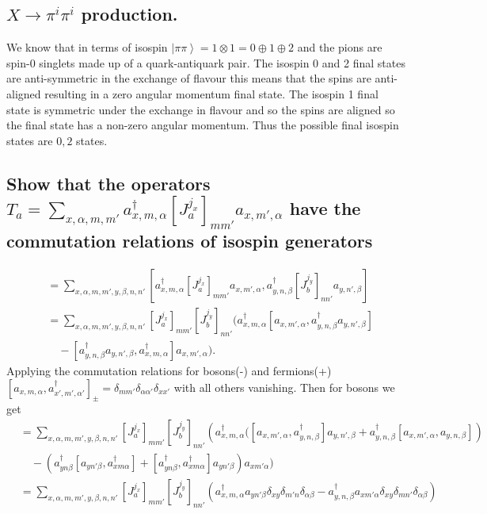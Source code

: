 \documentclass[main.tex]{subfiles}
\begin{document}
\subsection{$X\rightarrow\pi^i\pi^i$ production.}
We know that in terms of isospin $\left|\pi\pi\right>=1\otimes1=0\oplus1\oplus2$ and the pions are spin-$0$ singlets made up of a quark-antiquark pair. The isospin 0 and 2 final states are anti-symmetric in the exchange of flavour this means that the spins are anti-aligned resulting in a zero angular momentum final state. The isospin 1 final state is symmetric under the exchange in flavour and so the spins are aligned so the final state has a non-zero angular momentum. Thus the possible final isospin states are $0,2$ states.

\subsection{Show that the operators $T_a=\sum_{x,\alpha,m,m'}{a_{x,m,\alpha}^{\dagger}[J_a^{j_x}]_{mm'}a_{x,m',\alpha}}$ have the commutation relations of isospin generators}
\begin{align}
[T_a,T_b]&=\sum_{x,\alpha,m,m',y,\beta,n,n'}[a_{x,m,\alpha}^{\dagger}[J_a^{j_x}]_{mm'}a_{x,m',\alpha},{a_{y,n,\beta}^{\dagger}[J_b^{j_y}]_{nn'}a_{y,n',\beta}}]\\
&=\sum_{x,\alpha,m,m',y,\beta,n,n'}[J_a^{j_x}]_{mm'}[J_b^{j_y}]_{nn'}(a_{x,m,\alpha}^{\dagger}[a_{x,m',\alpha},{a_{y,n,\beta}^{\dagger}}a_{y,n',\beta}]\nonumber\\&\quad-[a^{\dagger}_{y,n,\beta}a_{y,n',\beta},a^{\dagger}_{x,m,\alpha}]a_{x,m',\alpha}).
\end{align}
Applying the commutation relations for bosons(-) and fermions(+) $[a_{x,m,\alpha},a^{\dagger}_{x',m',\alpha'}]_{\pm}=\delta_{mm'}\delta_{\alpha\alpha'}\delta_{xx'}$ with all others vanishing. Then for bosons we get
\begin{align}
[T_a,T_b]&=\sum_{x,\alpha,m,m',y,\beta,n,n'}[J_a^{j_x}]_{mm'}[J_b^{j_y}]_{nn'}(a_{x,m,\alpha}^{\dagger}\Big([a_{x,m',\alpha},a_{y,n,\beta}^{\dagger}]a_{y,n',\beta}+a^{\dagger}_{y,n,\beta}[a_{x,m',\alpha},a_{y,n,\beta}])\nonumber\\&\quad-(a_{yn\beta}^{\dagger}[a_{yn'\beta},a_{xm\alpha}^{\dagger}]+[a_{yn\beta}^{\dagger},a^{\dagger}_{xm\alpha}]a_{yn'\beta})a_{xm'\alpha}\Big)\\
&=\sum_{x,\alpha,m,m',y,\beta,n,n'}[J_a^{j_x}]_{mm'}[J_b^{j_y}]_{nn'}(a_{x,m,\alpha}^{\dagger}a_{yn'\beta}\delta_{xy}\delta_{m'n}\delta_{\alpha\beta}-a_{y,n,\beta}^{\dagger}a_{xm'\alpha}\delta_{xy}\delta_{mn'}\delta_{\alpha\beta})\label{eqn:5commutator}
\end{align}
\end{document}
